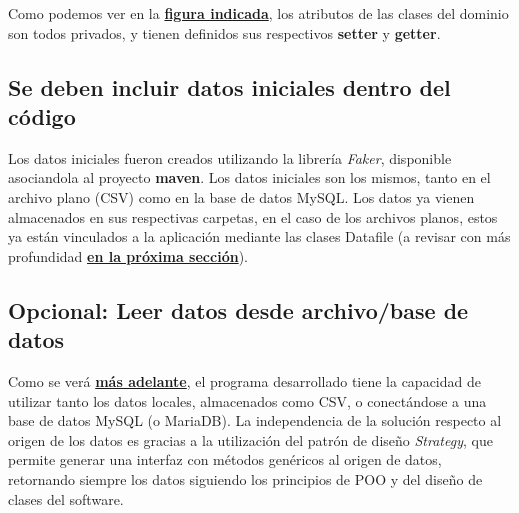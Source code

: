 Como podemos ver en la \textbf{\hyperref[fig:img7]{figura indicada}}, los atributos de las clases del dominio son todos privados, y tienen definidos sus respectivos \textbf{setter} y \textbf{getter}.

\subsection{Se deben incluir datos iniciales dentro del código}

Los datos iniciales fueron creados utilizando la librería \textit{Faker}, disponible asociandola al proyecto \textbf{maven}. Los datos iniciales son los mismos, tanto en el archivo plano (CSV) como en la base de datos MySQL. Los datos ya vienen almacenados en sus respectivas carpetas, en el caso de los archivos planos, estos ya están vinculados a la aplicación mediante las clases Datafile (a revisar con más profundidad \textbf{\hyperref[opc:leerdesdebd]{en la próxima sección}}).

\subsection*{Opcional: Leer datos desde archivo/base de datos}
\label{opc:leerdesdebd}

Como se verá \textbf{\hyperref[opc:leerdesdebd]{más adelante}}, el programa desarrollado tiene la capacidad de utilizar tanto los datos locales, almacenados como CSV, o conectándose a una base de datos MySQL (o MariaDB). La independencia de la solución respecto al origen de los datos es gracias a la utilización del patrón de diseño \textit{Strategy}, que permite generar una interfaz con métodos genéricos al origen de datos, retornando siempre los datos siguiendo los principios de POO y del diseño de clases del software.

